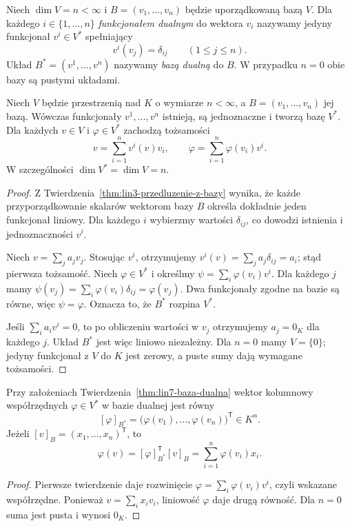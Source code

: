 \begin{definicja}
\label{def:lin7-baza-dualna}
Niech \(\dim V=n<\infty\) i
\(B=(v_1,\ldots,v_n)\) będzie
uporządkowaną bazą \(V\).
Dla każdego \(i\in\{1,\ldots,n\}\)
\emph{funkcjonałem dualnym}
do wektora \(v_i\) nazywamy
jedyny funkcjonał \(v^i\in V^*\)
spełniający
\[
 v^i(v_j)=\delta_{ij}
 \qquad (1\leq j\leq n).
\]
Układ \(B^*=(v^1,\ldots,v^n)\)
nazywamy \emph{bazą dualną} do \(B\).
W przypadku \(n=0\) obie bazy
są pustymi układami.
\end{definicja}

\begin{twierdzenie}
\label{thm:lin7-baza-dualna}
Niech \(V\) będzie przestrzenią nad \(K\)
o wymiarze \(n<\infty\), a
\(B=(v_1,\ldots,v_n)\) jej bazą.
Wówczas funkcjonały
\(v^1,\ldots,v^n\) istnieją,
są jednoznaczne i tworzą bazę \(V^*\).
Dla każdych \(v\in V\) i
\(\varphi\in V^*\) zachodzą
tożsamości
\[
 v=\sum_{i=1}^{n}v^i(v)v_i,
 \qquad
 \varphi=\sum_{i=1}^{n}\varphi(v_i)v^i.
\]
W szczególności \(\dim V^*=\dim V=n\).
\end{twierdzenie}
\begin{proof}
Z
Twierdzenia~\ref{thm:lin3-przedluzenie-z-bazy}
wynika, że każde przyporządkowanie
skalarów wektorom bazy \(B\)
określa dokładnie jeden funkcjonał
liniowy. Dla każdego \(i\) wybierzmy
wartości \(\delta_{ij}\), co dowodzi
istnienia i jednoznaczności \(v^i\).

Niech \(v=\sum_j a_jv_j\).
Stosując \(v^i\), otrzymujemy
\(v^i(v)=\sum_j a_j\delta_{ij}=a_i\);
stąd pierwsza tożsamość.
Niech \(\varphi\in V^*\) i określmy
\(\psi=\sum_i\varphi(v_i)v^i\).
Dla każdego \(j\) mamy
\(\psi(v_j)=\sum_i\varphi(v_i)\delta_{ij}
=\varphi(v_j)\).
Dwa funkcjonały zgodne na bazie są
równe, więc \(\psi=\varphi\).
Oznacza to, że \(B^*\) rozpina \(V^*\).

Jeśli \(\sum_i a_iv^i=0\),
to po obliczeniu wartości w \(v_j\)
otrzymujemy \(a_j=0_K\) dla każdego
\(j\). Układ \(B^*\) jest więc
liniowo niezależny.
Dla \(n=0\) mamy \(V=\{0\}\);
jedyny funkcjonał z \(V\) do \(K\)
jest zerowy, a puste sumy
dają wymagane tożsamości.
\end{proof}

\begin{wniosek}
\label{cor:lin7-wspolrzedne-dualne}
Przy założeniach
Twierdzenia~\ref{thm:lin7-baza-dualna}
wektor kolumnowy współrzędnych
\(\varphi\in V^*\) w bazie dualnej
jest równy
\[
 [\varphi]_{B^*}
 =\bigl(\varphi(v_1),\ldots,\varphi(v_n)
   \bigr)^{\mathsf T}\in K^n.
\]
Jeżeli \([v]_B=(x_1,\ldots,x_n)^{\mathsf T}\),
to
\[
 \varphi(v)=[\varphi]_{B^*}^{\mathsf T}[v]_B
 =\sum_{i=1}^n \varphi(v_i)x_i.
\]
\end{wniosek}
\begin{proof}
Pierwsze twierdzenie daje rozwinięcie
\(\varphi=\sum_i\varphi(v_i)v^i\),
czyli wskazane współrzędne.
Ponieważ \(v=\sum_i x_iv_i\),
liniowość \(\varphi\) daje drugą równość.
Dla \(n=0\) suma jest pusta i wynosi
\(0_K\).
\end{proof}

